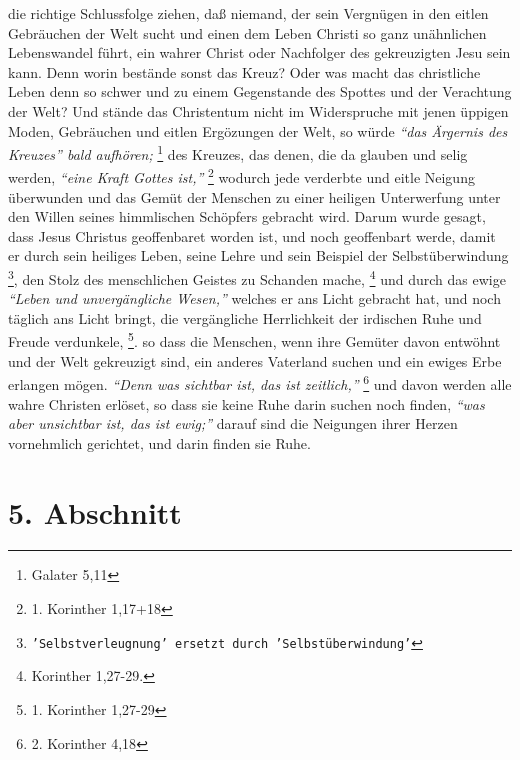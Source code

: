 die richtige Schlussfolge ziehen, daß niemand, der sein Vergnügen in den eitlen
Gebräuchen der Welt sucht und einen dem Leben Christi so ganz unähnlichen
Lebenswandel führt, ein wahrer Christ oder Nachfolger des gekreuzigten Jesu sein
kann. Denn worin bestände sonst das Kreuz? Oder was macht das christliche
Leben denn so schwer und zu einem Gegenstande des Spottes und der Verachtung der
Welt? Und stände das Christentum nicht im Widerspruche mit jenen üppigen Moden,
Gebräuchen und eitlen Ergözungen der Welt, so würde
\textit{"`das Ärgernis des Kreuzes"' bald aufhören;}
\footnote{Galater 5,11}
des Kreuzes, das denen, die da glauben und
selig werden,
\textit{"`eine Kraft Gottes ist,"'}
\footnote{1. Korinther 1,17+18}
wodurch jede
verderbte und eitle Neigung überwunden und das Gemüt der Menschen zu einer
heiligen Unterwerfung unter den Willen seines himmlischen Schöpfers gebracht
wird. Darum wurde gesagt, dass Jesus Christus geoffenbaret worden ist, und noch
geoffenbart werde, damit er durch sein heiliges Leben, seine Lehre und sein
Beispiel der Selbstüberwindung
\footnote{\texttt{'Selbstverleugnung' ersetzt durch 'Selbstüberwindung'}}, den Stolz des menschlichen Geistes zu Schanden
mache,
\footnote{Korinther 1,27-29.}
und durch das ewige \textit{"`Leben und unvergängliche
Wesen,"'} welches er ans Licht gebracht hat, und noch täglich ans Licht bringt,
die vergängliche Herrlichkeit der irdischen Ruhe und Freude
verdunkele,
\footnote{1. Korinther 1,27-29}.
so dass die Menschen, wenn ihre
Gemüter davon entwöhnt und der Welt gekreuzigt sind, ein anderes Vaterland
suchen und ein ewiges Erbe erlangen mögen.
\textit{"`Denn was sichtbar ist, das ist zeitlich,"'}
\footnote{2. Korinther 4,18}
und davon werden alle wahre Christen erlöset,
so dass sie keine Ruhe darin suchen noch finden,
\textit{"`was aber unsichtbar ist, das
ist ewig;"'} darauf sind die Neigungen ihrer Herzen vornehmlich gerichtet, und
darin finden sie Ruhe.

\section{5. Abschnitt} \label{kap16_ab5}

